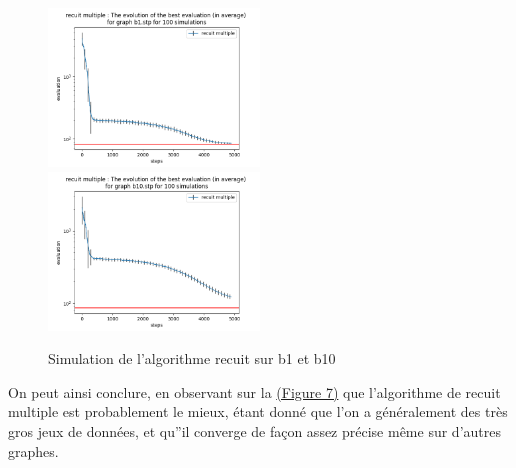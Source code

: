 \documentclass[11pt,french]{report}
\begin{document}
        \begin{figure}
          \includegraphics[width=0.5\textwidth]{best_b1_evaluation_recuit multiple.png}
          \includegraphics[width=0.5\textwidth]{best_b10_evaluation_recuit multiple.png}
          \caption{Simulation de l'algorithme recuit sur b1 et b10}
          \label{Figure7}
        \end{figure}

        On peut ainsi conclure, en observant sur la \hyperref[Figure7]{(Figure 7)} que l'algorithme de recuit multiple est probablement le mieux, étant donné que l'on a généralement des très gros jeux de données, et qu''il converge de façon assez précise même sur d'autres graphes.
        
\end{document}
